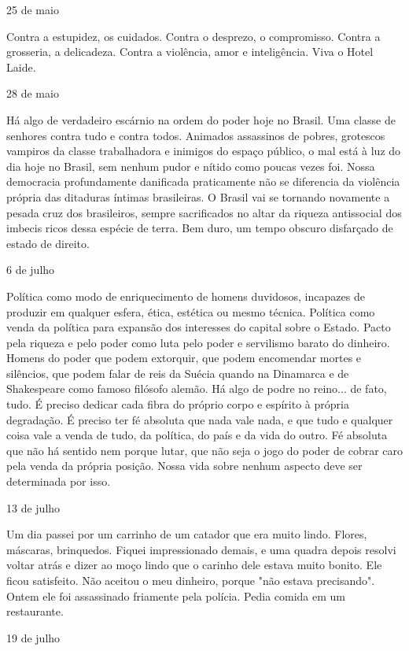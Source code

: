 25 de maio

Contra a estupidez, os cuidados. Contra o desprezo, o compromisso.
Contra a grosseria, a delicadeza. Contra a violência, amor e
inteligência. Viva o Hotel Laide.

28 de maio

Há algo de verdadeiro escárnio na ordem do poder hoje no Brasil. Uma
classe de senhores contra tudo e contra todos. Animados assassinos de
pobres, grotescos vampiros da classe trabalhadora e inimigos do espaço
público, o mal está à luz do dia hoje no Brasil, sem nenhum pudor e
nítido como poucas vezes foi. Nossa democracia profundamente danificada
praticamente não se diferencia da violência própria das ditaduras
íntimas brasileiras. O Brasil vai se tornando novamente a pesada cruz
dos brasileiros, sempre sacrificados no altar da riqueza antissocial dos
imbecis ricos dessa espécie de terra. Bem duro, um tempo obscuro
disfarçado de estado de direito.

6 de julho

Política como modo de enriquecimento de homens duvidosos, incapazes de
produzir em qualquer esfera, ética, estética ou mesmo técnica. Política
como venda da política para expansão dos interesses do capital sobre o
Estado. Pacto pela riqueza e pelo poder como luta pelo poder e
servilismo barato do dinheiro. Homens do poder que podem extorquir, que
podem encomendar mortes e silêncios, que podem falar de reis da Suécia
quando na Dinamarca e de Shakespeare como famoso filósofo alemão. Há
algo de podre no reino... de fato, tudo. É preciso dedicar cada fibra do
próprio corpo e espírito à própria degradação. É preciso ter fé absoluta
que nada vale nada, e que tudo e qualquer coisa vale a venda de tudo, da
política, do país e da vida do outro. Fé absoluta que não há sentido nem
porque lutar, que não seja o jogo do poder de cobrar caro pela venda da
própria posição. Nossa vida sobre nenhum aspecto deve ser determinada
por isso.

13 de julho

Um dia passei por um carrinho de um catador que era muito lindo. Flores,
máscaras, brinquedos. Fiquei impressionado demais, e uma quadra depois
resolvi voltar atrás e dizer ao moço lindo que o carinho dele estava
muito bonito. Ele ficou satisfeito. Não aceitou o meu dinheiro, porque
"não estava precisando". Ontem ele foi assassinado friamente pela
polícia. Pedia comida em um restaurante.

19 de julho

